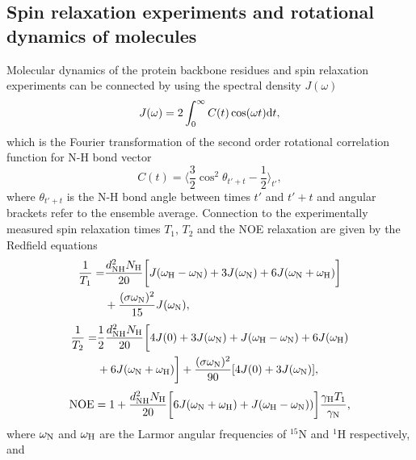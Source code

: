 \documentclass[journal=jpcbfk,manuscript=article]{achemso}
\begin{document}
\subsection{Spin relaxation experiments and rotational dynamics of molecules}
Molecular dynamics of the protein backbone residues and spin relaxation experiments can
be connected by using the spectral density $J(\omega)$ 
\begin{equation}\label{SPECTdens}
  J(\omega)=2\int_0^\infty C(t) \cos(\omega t) {\rm d}t,
\end{equation}
which is the Fourier transformation of the second order
rotational correlation function for N-H bond vector
\begin{equation}\label{CORRFdef}
  C(t)=\langle \frac{3}{2}\cos^2\theta_{t'+t}-\frac{1}{2} \rangle_{t'},
\end{equation}
where $\theta_{t'+t}$ is the N-H bond angle between times $t'$ and $t'+t$
and angular brackets refer to the ensemble average.
Connection to the experimentally measured spin relaxation times $T_1$, $T_2$
and the NOE relaxation are given by the Redfield equations~\cite{abragam,kay89}
\begin{equation}\label{R1}
  \begin{aligned}
  \frac{1}{T_1}= & \frac{d_{\rm{NH}}^2N_{\rm{H}}}{20}\bigg[J(\omega_{\rm{H}}-\omega_{\rm{N}})+3J(\omega_{\rm{N}})+6J(\omega_{\rm{N}}+\omega_{\rm{H}})\bigg] \\
        & +\frac{(\sigma \omega_{\rm{N}})^2}{15}J(\omega_{\rm{N}}),
  \end{aligned}
\end{equation}
\begin{equation}\label{R2}
    \begin{aligned}
  \frac{1}{T_2}= & \frac{1}{2}\frac{d_{\rm{NH}}^2N_{\rm{H}}}{20}\bigg[4J(0)+3J(\omega_{\rm{N}})+J(\omega_{\rm{H}}-\omega_{\rm{N}})+6J(\omega_{\rm{H}})  \\
    & +6J(\omega_{\rm{N}}+\omega_{\rm{H}})\bigg]+\frac{(\sigma \omega_{\rm{N}})^2}{90}[4J(0) +3J(\omega_{\rm{N}})],
    \end{aligned}
\end{equation}
\begin{equation}\label{NOE}
  {\rm NOE}=1+\frac{d_{\rm{NH}}^2N_{\rm{H}}}{20}\bigg[6J(\omega_{\rm{N}}+\omega_{\rm{H}})+J(\omega_{\rm{H}}-\omega_{\rm{N}}))\bigg]\frac{\gamma_{\rm{H}}T_1}{\gamma_{\rm{N}}},
\end{equation}
where $\omega_{\rm{N}}$ and $\omega_{\rm{H}}$ are the Larmor angular
frequencies of $^{15}$N and $^1$H respectively, and
\end{document}
